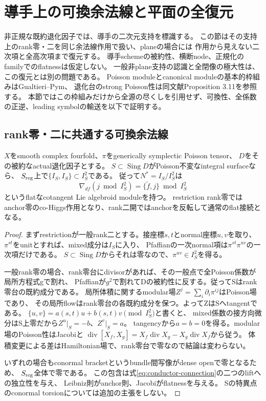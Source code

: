 \section{導手上の可換余法線と平面の全復元}\label{sec:conductor-reconstruction}
非正規な既約退化因子では、導手の二次元支持を標識する。
この節はその支持上のrank零・二を同じ余法線作用で扱い、planeの場合には
作用から見えない二次項と全高次項まで復元する。
導手schemeの被約性、横断node、正規化のfamilyでのflatnessは仮定しない。
一般非plane支持の認識と全閉像の極大性は、この復元とは別の問題である。
Poisson moduleとcanonical moduleの基本的枠組みはGualtieri--Pym\cite[\S4.1, Example 4.4]{GPconductor}、
退化台のstrong Poisson性は同文献Proposition 3.11を参照する。
本節ではこの枠組みだけから全源の尽くしを引用せず、可換性、全係数の正逆、leading symbolの輸送を以下で証明する。


\subsection{rank零・二に共通する可換余法線}
\begin{proposition}[可換余法線とflat作用]\label{prop:conductor-abelian-module}
$X$をsmooth complex fourfold、$\pi$をgenerically symplectic Poisson tensor、
$D$をその被約なactual退化因子とする。
$S\subset\operatorname{Sing}D$がPoisson不変なintegral surfaceなら、
$S_{\rm reg}$上で$\{I_S,I_S\}\subset I_S^2$である。
従って$N^*=I_S/I_S^2$は
\begin{equation}
 \nabla_{df}(j\bmod I_S^2)=\{\widetilde f,j\}\bmod I_S^2
 \label{eq:conductor-connection}
\end{equation}
というflatなcotangent Lie algebroid moduleを持つ。
restriction rank零ではanchor零のco-Higgs作用となり、rank二開ではanchorを反転して通常のflat接続となる。
\end{proposition}
\begin{proof}
まずrestrictionが一般rank二とする。接座標$s,t$とnormal座標$u,v$を取り、
$\pi^{st}$をunitとすれば、mixed成分は$I_S$に入り、
Pfaffianの一次normal項は$\pi^{st}\pi^{uv}$の一次項だけである。
$S\subset\operatorname{Sing}D$からそれは零なので、$\pi^{uv}\in I_S^2$を得る。

一般rank零の場合、rank零台にdivisorがあれば、その一般点で全Poisson係数が局所方程式gで割れ、
Pfaffianが$g^2$で割れてDの被約性に反する。従ってSはrank零台の既約成分である。
局所体積に関するmodular場$Z^j=\sum_i\partial_i\pi^{ij}$はPoisson場であり、
その局所flowはrank零台の各既約成分を保つ。よってZはSへtangentである。
$\{u,v\}=a(s,t)u+b(s,t)v\pmod {I_S^2}$と書くと、
mixed係数の接方向微分はS上零だから$Z^u|_S=-b$、$Z^v|_S=a$。
tangencyから$a=b=0$を得る。modular場のPoisson性はJacobiと
$\operatorname{div}[X_f,X_g]=X_f\operatorname{div}X_g-X_g\operatorname{div}X_f$から従う。
体積変更による差はHamiltonian場で、rank零台で零なので結論は変わらない。

いずれの場合もconormal bracketというbundle間写像がdense openで零となるため、
$S_{\rm reg}$全体で零である。
この包含は式\eqref{eq:conductor-connection}の二つのliftへの独立性を与え、
Leibniz則がanchor則、Jacobiがflatnessを与える。
Sの特異点のconormal torsionについては追加の主張をしない。
\end{proof}


